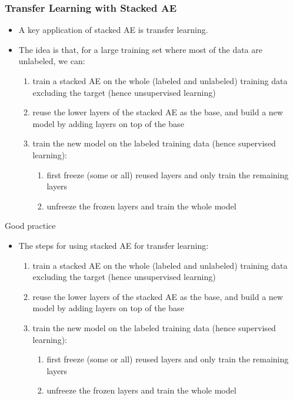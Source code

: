 \documentclass{beamer}
\begin{document}
\begin{frame}
\setlength{\leftmargini}{0.3cm}
\setlength{\leftmarginii}{0.6cm}
\setlength{\leftmarginiii}{0.9cm}
\frametitle{Transfer Learning with Stacked AE}
\begin{itemize}
\footnotesize
\item A key application of stacked AE is transfer learning.
\item The idea is that, for a large training set where most of the data are unlabeled, we can:
	\begin{enumerate}
	\footnotesize
	\item train a stacked AE on the whole (labeled and unlabeled) training data excluding the target (hence unsupervised learning)
	\item reuse the lower layers of the stacked AE as the base, and build a new model by adding layers on top of the base
	\item train the new model on the labeled training data (hence supervised learning):
		\begin{enumerate}
		\footnotesize
		\item first freeze (some or all) reused layers and only train the remaining layers
		\item unfreeze the frozen layers and train the whole model
		\end{enumerate} 
	\end{enumerate} 
\end{itemize}
\vspace{-0.2cm}
\begin{bclogo}
[couleur = green!30,
arrondi = 0,
ombre = false]
{Good practice}
\setlength{\leftmargini}{0.2cm}
\setlength{\leftmarginii}{0.2cm}
\begin{itemize}
\footnotesize
\item The steps for using stacked AE for transfer learning:
	\begin{enumerate}
	\footnotesize
	\item train a stacked AE on the whole (labeled and unlabeled) training data excluding the target (hence unsupervised learning)
	\item reuse the lower layers of the stacked AE as the base, and build a new model by adding layers on top of the base
	\item train the new model on the labeled training data (hence supervised learning):
		\begin{enumerate}
		\footnotesize
		\item first freeze (some or all) reused layers and only train the remaining layers
		\item unfreeze the frozen layers and train the whole model
		\end{enumerate} 
	\end{enumerate} 
\end{itemize}
\end{bclogo}
\end{frame}
\end{document}
